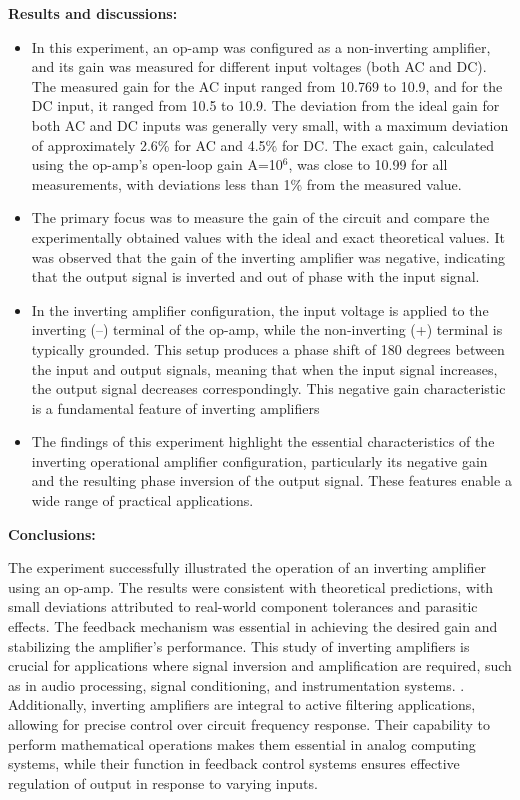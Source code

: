 \documentclass[11pt]{scrreprt}
\begin{document}
\noindent\textbf{ Results and discussions:}
\begin{itemize}
\item In this experiment, an op-amp was configured as a non-inverting amplifier, and its gain was measured for different input voltages (both AC and DC). The measured gain for the AC input ranged from 10.769 to 10.9, and for the DC input, it ranged from 10.5 to 10.9. The deviation from the ideal gain for both AC and DC inputs was generally very small, with a maximum deviation of approximately 2.6\% for AC and 4.5\% for DC. The exact gain, calculated using the op-amp’s open-loop gain A=10$^6$, was close to 10.99 for all measurements, with deviations less than 1\% from the measured value.
\item The primary focus was to measure the gain of the circuit and compare the experimentally obtained values with the ideal and exact theoretical values. It was observed that the gain of the inverting amplifier was negative, indicating that the output signal is inverted and out of phase with the input signal.

\item In the inverting amplifier configuration, the input voltage is applied to the inverting (–) terminal of the op-amp, while the non-inverting (+) terminal is typically grounded. This setup produces a phase shift of 180 degrees between the input and output signals, meaning that when the input signal increases, the output signal decreases correspondingly. This negative gain characteristic is a fundamental feature of inverting amplifiers
\item The findings of this experiment highlight the essential characteristics of the inverting operational amplifier configuration, particularly its negative gain and the resulting phase inversion of the output signal. These features enable a wide range of practical applications.



\end{itemize}
\noindent\textbf{Conclusions:}
\par The experiment successfully illustrated the operation of an inverting amplifier using an op-amp. The results were consistent with theoretical predictions, with small deviations attributed to real-world component tolerances and parasitic effects. The feedback mechanism was essential in achieving the desired gain and stabilizing the amplifier's performance. This study of inverting amplifiers is crucial for applications where signal inversion and amplification are required, such as in audio processing, signal conditioning, and instrumentation systems. . Additionally, inverting amplifiers are integral to active filtering applications, allowing for precise control over circuit frequency response. Their capability to perform mathematical operations makes them essential in analog computing systems, while their function in feedback control systems ensures effective regulation of output in response to varying inputs.
\newpage
\end{document}
